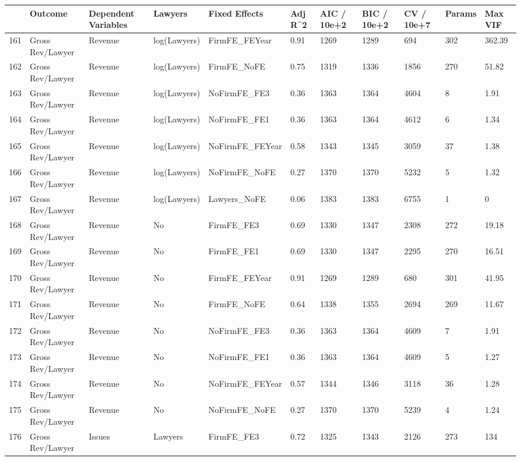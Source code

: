 \documentclass{article}
\begin{document}
\begin{table}[H]
\centering
\begin{tabular}{rllllllllll}
  \hline
 & Outcome & Dependent Variables & Lawyers & Fixed Effects & Adj R^2 & AIC / 10e+2 & BIC / 10e+2 & CV / 10e+7 & Params & Max VIF \\ 
  \hline
161 & Gross Rev/Lawyer & Revenue & log(Lawyers) & FirmFE\_FEYear & 0.91 & 1269 & 1289 & 694 & 302 & 362.39 \\ 
  162 & Gross Rev/Lawyer & Revenue & log(Lawyers) & FirmFE\_NoFE & 0.75 & 1319 & 1336 & 1856 & 270 & 51.82 \\ 
  163 & Gross Rev/Lawyer & Revenue & log(Lawyers) & NoFirmFE\_FE3 & 0.36 & 1363 & 1364 & 4604 & 8 & 1.91 \\ 
  164 & Gross Rev/Lawyer & Revenue & log(Lawyers) & NoFirmFE\_FE1 & 0.36 & 1363 & 1364 & 4612 & 6 & 1.34 \\ 
  165 & Gross Rev/Lawyer & Revenue & log(Lawyers) & NoFirmFE\_FEYear & 0.58 & 1343 & 1345 & 3059 & 37 & 1.38 \\ 
  166 & Gross Rev/Lawyer & Revenue & log(Lawyers) & NoFirmFE\_NoFE & 0.27 & 1370 & 1370 & 5232 & 5 & 1.32 \\ 
  167 & Gross Rev/Lawyer & Revenue & log(Lawyers) & Lawyers\_NoFE & 0.06 & 1383 & 1383 & 6755 & 1 & 0 \\ 
  168 & Gross Rev/Lawyer & Revenue & No & FirmFE\_FE3 & 0.69 & 1330 & 1347 & 2308 & 272 & 19.18 \\ 
  169 & Gross Rev/Lawyer & Revenue & No & FirmFE\_FE1 & 0.69 & 1330 & 1347 & 2295 & 270 & 16.51 \\ 
  170 & Gross Rev/Lawyer & Revenue & No & FirmFE\_FEYear & 0.91 & 1269 & 1289 & 680 & 301 & 41.95 \\ 
  171 & Gross Rev/Lawyer & Revenue & No & FirmFE\_NoFE & 0.64 & 1338 & 1355 & 2694 & 269 & 11.67 \\ 
  172 & Gross Rev/Lawyer & Revenue & No & NoFirmFE\_FE3 & 0.36 & 1363 & 1364 & 4609 & 7 & 1.91 \\ 
  173 & Gross Rev/Lawyer & Revenue & No & NoFirmFE\_FE1 & 0.36 & 1363 & 1364 & 4609 & 5 & 1.27 \\ 
  174 & Gross Rev/Lawyer & Revenue & No & NoFirmFE\_FEYear & 0.57 & 1344 & 1346 & 3118 & 36 & 1.28 \\ 
  175 & Gross Rev/Lawyer & Revenue & No & NoFirmFE\_NoFE & 0.27 & 1370 & 1370 & 5239 & 4 & 1.24 \\ 
  176 & Gross Rev/Lawyer & Issues & Lawyers & FirmFE\_FE3 & 0.72 & 1325 & 1343 & 2126 & 273 & 134 \\ 

\end{tabular}
\end{table}
\end{document}
